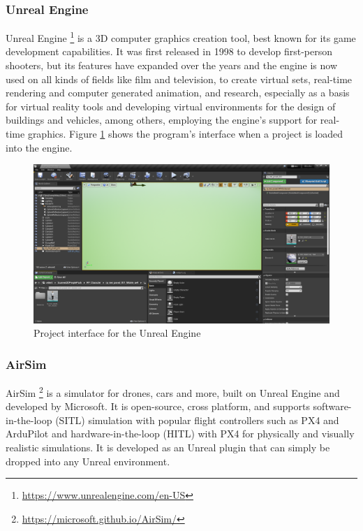 \subsubsection{Unreal Engine}
\label{subsec:unreal}

Unreal Engine \footnote{\url{https://www.unrealengine.com/en-US}} is a 3D computer graphics creation tool, best known for its game development capabilities.
It was first released in 1998 to develop first-person shooters, but its features have expanded over the years and the engine is now used on all kinds of fields like film and television, to create virtual sets, real-time rendering and computer generated animation, and research, especially as a basis for virtual reality tools and developing virtual environments for the design of buildings and vehicles, among others, employing the engine's support for real-time graphics.
Figure \ref{fig:ue-interface} shows the program's interface when a project is loaded into the engine.

\begin{figure}
  \centering
  \includegraphics[width=\textwidth,keepaspectratio]{img/ue-interface.png}
  \caption{Project interface for the Unreal Engine}\label{fig:ue-interface}
\end{figure}


\subsubsection{AirSim}
\label{subsec:airsim}
AirSim \footnote{\url{https://microsoft.github.io/AirSim/}} is a simulator for drones, cars and more, built on Unreal Engine and developed by Microsoft. It is open-source, cross platform, and supports software-in-the-loop (SITL) simulation with popular flight controllers such as PX4 and ArduPilot and hardware-in-the-loop (HITL) with PX4 for physically and visually realistic simulations. 
It is developed as an Unreal plugin that can simply be dropped into any Unreal environment.

